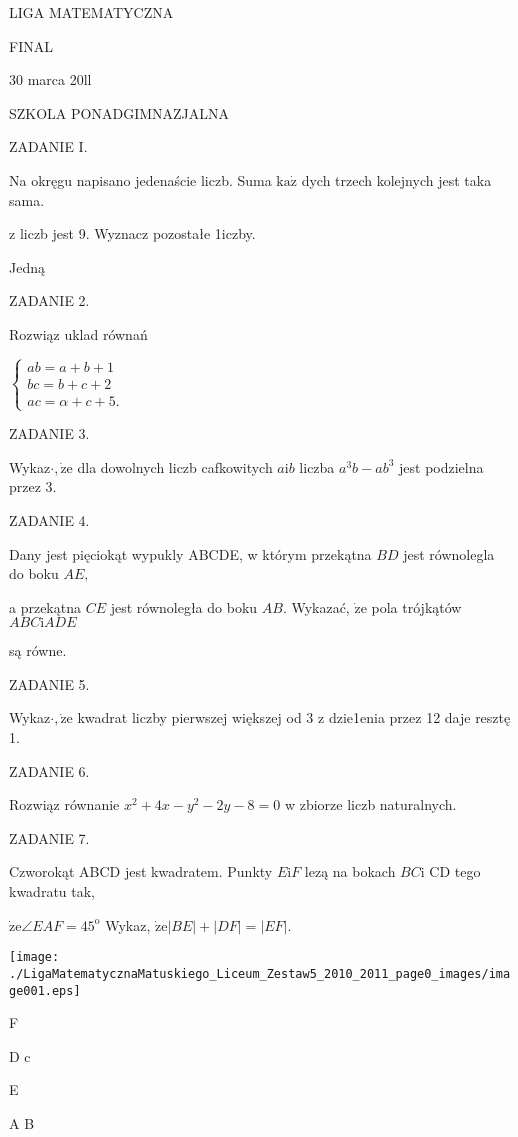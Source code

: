 \documentclass[a4paper,12pt]{article}
\begin{document}
LIGA MATEMATYCZNA

FINAL

30 marca 20ll

SZKOLA PONADGIMNAZJALNA

ZADANIE I.

Na okręgu napisano jedenaście liczb. Suma $\mathrm{k}\mathrm{a}\dot{\mathrm{z}}$ dych trzech kolejnych jest taka sama.

z liczb jest 9. Wyznacz pozostałe 1iczby.

Jedną

ZADANIE 2.

Rozwiąz uklad równań

$\left\{\begin{array}{l}
ab=a+b+1\\
bc=b+c+2\\
ac=\alpha+c+5.
\end{array}\right.$

ZADANIE 3.

Wykaz$\cdot, \dot{\mathrm{z}}\mathrm{e}$ dla dowolnych liczb cafkowitych $a\mathrm{i}b$ liczba $a^{3}b-ab^{3}$ jest podzielna przez 3.

ZADANIE 4.

Dany jest pięciokąt wypukly ABCDE, w którym przekątna $BD$ jest równolegla do boku $AE,$

a przekątna $CE$ jest równoległa do boku $AB$. Wykazać, $\dot{\mathrm{z}}\mathrm{e}$ pola trójkątów $ABC \mathrm{i} ADE$

są równe.

ZADANIE 5.

Wykaz$\cdot, \dot{\mathrm{z}}\mathrm{e}$ kwadrat liczby pierwszej większej od 3 z dzie1enia przez 12 daje resztę 1.

ZADANIE 6.

Rozwiąz równanie $x^{2}+4x-y^{2}-2y-8=0$ w zbiorze liczb naturalnych.

ZADANIE 7.

Czworokąt ABCD jest kwadratem. Punkty $E\mathrm{i}F$ lezą na bokach $BC\mathrm{i}$ CD tego kwadratu tak,

$\dot{\mathrm{z}}\mathrm{e}\angle EAF=45^{\mathrm{o}}$ Wykaz, $\dot{\mathrm{z}}\mathrm{e}|BE|+|DF|=|EF|.$
\begin{center}
\texttt{[image: ./LigaMatematycznaMatuskiego\_Liceum\_Zestaw5\_2010\_2011\_page0\_images/image001.eps]}
\end{center}
F

D c

E

A  B
\end{document}
